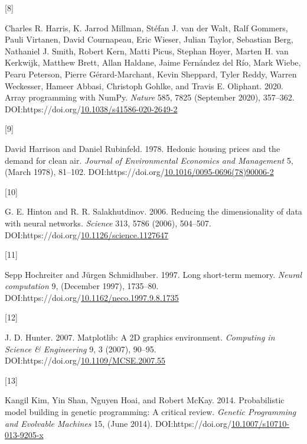 \documentclass[
  11pt,
]{article}
\newlength{\cslhangindent}
\newlength{\csllabelwidth}
\newlength{\cslentryspacingunit} %
\newenvironment{CSLReferences}[2] %
 {%
  \setlength{\parindent}{0pt}
  \ifodd #1
  \let\oldpar\par
  \def\par{\hangindent=\cslhangindent\oldpar}
  \fi
  \setlength{\parskip}{#2\cslentryspacingunit}
 }%
 {}
\newcommand{\CSLLeftMargin}[1]{\parbox[t]{\csllabelwidth}{#1}}
\newcommand{\CSLRightInline}[1]{\parbox[t]{\linewidth - \csllabelwidth}{#1}\break}
\begin{document}
\begin{CSLReferences}{0}{0}
\leavevmode{}%
\CSLLeftMargin{{[}8{]} }%
\CSLRightInline{Charles R. Harris, K. Jarrod Millman, Stéfan J. van der Walt, Ralf Gommers, Pauli Virtanen, David Cournapeau, Eric Wieser, Julian Taylor, Sebastian Berg, Nathaniel J. Smith, Robert Kern, Matti Picus, Stephan Hoyer, Marten H. van Kerkwijk, Matthew Brett, Allan Haldane, Jaime Fernández del Río, Mark Wiebe, Pearu Peterson, Pierre Gérard-Marchant, Kevin Sheppard, Tyler Reddy, Warren Weckesser, Hameer Abbasi, Christoph Gohlke, and Travis E. Oliphant. 2020. Array programming with {NumPy}. \emph{Nature} 585, 7825 (September 2020), 357--362. DOI:https://doi.org/\href{https://doi.org/10.1038/s41586-020-2649-2}{10.1038/s41586-020-2649-2}}

\leavevmode{}%
\CSLLeftMargin{{[}9{]} }%
\CSLRightInline{David Harrison and Daniel Rubinfeld. 1978. Hedonic housing prices and the demand for clean air. \emph{Journal of Environmental Economics and Management} 5, (March 1978), 81--102. DOI:https://doi.org/\href{https://doi.org/10.1016/0095-0696(78)90006-2}{10.1016/0095-0696(78)90006-2}}

\leavevmode{}%
\CSLLeftMargin{{[}10{]} }%
\CSLRightInline{G. E. Hinton and R. R. Salakhutdinov. 2006. Reducing the dimensionality of data with neural networks. \emph{Science} 313, 5786 (2006), 504--507. DOI:https://doi.org/\href{https://doi.org/10.1126/science.1127647}{10.1126/science.1127647}}

\leavevmode{}%
\CSLLeftMargin{{[}11{]} }%
\CSLRightInline{Sepp Hochreiter and Jürgen Schmidhuber. 1997. Long short-term memory. \emph{Neural computation} 9, (December 1997), 1735--80. DOI:https://doi.org/\href{https://doi.org/10.1162/neco.1997.9.8.1735}{10.1162/neco.1997.9.8.1735}}

\leavevmode{}%
\CSLLeftMargin{{[}12{]} }%
\CSLRightInline{J. D. Hunter. 2007. Matplotlib: A 2D graphics environment. \emph{Computing in Science \& Engineering} 9, 3 (2007), 90--95. DOI:https://doi.org/\href{https://doi.org/10.1109/MCSE.2007.55}{10.1109/MCSE.2007.55}}

\leavevmode{}%
\CSLLeftMargin{{[}13{]} }%
\CSLRightInline{Kangil Kim, Yin Shan, Nguyen Hoai, and Robert McKay. 2014. Probabilistic model building in genetic programming: A critical review. \emph{Genetic Programming and Evolvable Machines} 15, (June 2014). DOI:https://doi.org/\href{https://doi.org/10.1007/s10710-013-9205-x}{10.1007/s10710-013-9205-x}}


\end{CSLReferences}
\end{document}
